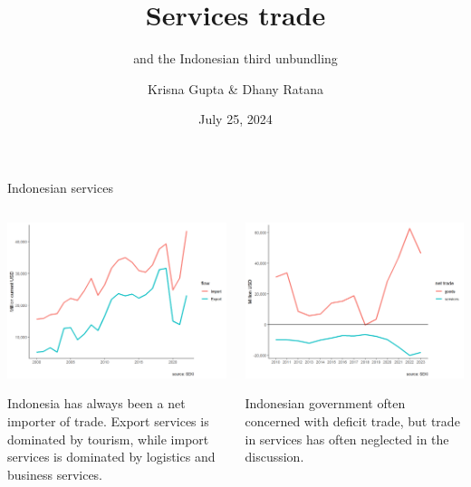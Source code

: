 \documentclass[
  ignorenonframetext,
]{beamer}
\title{Services trade}
\subtitle{and the Indonesian third unbundling}
\author{Krisna Gupta \& Dhany Ratana}
\date{July 25, 2024}
\institute{CIPS, Politeknik APP Jakarta}
\begin{document}
\frame{\titlepage}

\begin{frame}{Indonesian services}
\label{indonesian-services}
\begin{columns}[T]
\begin{column}{0.47\textwidth}
\includegraphics{plot/slides/fig1.png}

Indonesia has always been a net importer of trade. Export services is
dominated by tourism, while import services is dominated by logistics
and business services.
\end{column}

\begin{column}{0.47\textwidth}
\includegraphics{plot/slides/fig2.png}

Indonesian government often concerned with deficit trade, but trade in
services has often neglected in the discussion.
\end{column}
\end{columns}
\end{frame}
\end{document}

